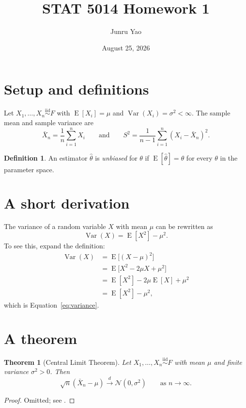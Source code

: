 \documentclass[11pt]{article}
\title{STAT 5014 Homework 1}
\author{Junru Yao}
\date{August 25, 2026}
\newcommand{\iid}{\mathrel{\overset{\mathrm{iid}}{\sim}}}
\DeclareMathOperator{\Var}{Var}
\DeclareMathOperator{\E}{E}
\newtheorem{theorem}{Theorem}
\theoremstyle{definition}
\newtheorem{definition}{Definition}
\begin{document}
\maketitle

\section{Setup and definitions}

Let $X_1,\ldots,X_n \iid F$ with $\E[X_i]=\mu$ and
$\Var(X_i)=\sigma^2<\infty$. The sample mean and sample variance are
\[
  \bar X_n=\frac{1}{n}\sum_{i=1}^n X_i
  \qquad\text{and}\qquad
  S^2=\frac{1}{n-1}\sum_{i=1}^n (X_i-\bar X_n)^2.
\]

\begin{definition}
An estimator $\hat\theta$ is \emph{unbiased} for $\theta$ if
$\E[\hat\theta]=\theta$ for every $\theta$ in the parameter space.
\end{definition}

\section{A short derivation}

The variance of a random variable $X$ with mean $\mu$ can be rewritten as
\begin{equation}
  \Var(X)=\E[X^2]-\mu^2.
  \label{eq:variance}
\end{equation}
To see this, expand the definition:
\begin{align}
  \Var(X) &= \E\big[(X-\mu)^2\big] \\
           &= \E\big[X^2-2\mu X+\mu^2\big] \\
           &= \E[X^2]-2\mu\E[X]+\mu^2 \\
           &= \E[X^2]-\mu^2,
\end{align}
which is Equation~\eqref{eq:variance}.

\section{A theorem}

\begin{theorem}[Central Limit Theorem]
Let $X_1,\ldots,X_n \iid F$ with mean $\mu$ and finite variance
$\sigma^2>0$. Then
\[
  \sqrt{n}(\bar X_n-\mu)\xrightarrow{d}\mathcal{N}(0,\sigma^2)
  \qquad\text{as }n\to\infty.
\]
\end{theorem}

\begin{proof}
Omitted; see \citet[Ch.~5]{casella2002}.
\end{proof}
\end{document}
